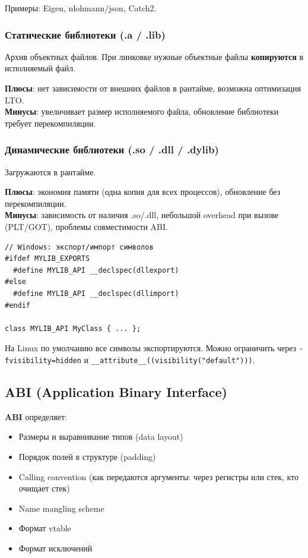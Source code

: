 \documentclass[12pt,a4paper]{article}
\begin{document}
Примеры: Eigen, nlohmann/json, Catch2.

\subsubsection{Статические библиотеки (.a / .lib)}
Архив объектных файлов. При линковке нужные объектные файлы \textbf{копируются} в исполняемый файл.

\textbf{Плюсы}: нет зависимости от внешних файлов в рантайме, возможна оптимизация LTO.\\
\textbf{Минусы}: увеличивает размер исполняемого файла, обновление библиотеки требует перекомпиляции.

\subsubsection{Динамические библиотеки (.so / .dll / .dylib)}
Загружаются в рантайме.

\textbf{Плюсы}: экономия памяти (одна копия для всех процессов), обновление без перекомпиляции.\\
\textbf{Минусы}: зависимость от наличия .so/.dll, небольшой overhead при вызове (PLT/GOT), проблемы совместимости ABI.

\begin{lstlisting}
// Windows: экспорт/импорт символов
#ifdef MYLIB_EXPORTS
  #define MYLIB_API __declspec(dllexport)
#else
  #define MYLIB_API __declspec(dllimport)
#endif

class MYLIB_API MyClass { ... };
\end{lstlisting}

На Linux по умолчанию все символы экспортируются. Можно ограничить через \texttt{-fvisibility=hidden} и \texttt{\_\_attribute\_\_((visibility("default")))}.

\subsection{ABI (Application Binary Interface)}

\textbf{ABI} определяет:
\begin{itemize}
    \item Размеры и выравнивание типов (data layout)
    \item Порядок полей в структуре (padding)
    \item Calling convention (как передаются аргументы: через регистры или стек, кто очищает стек)
    \item Name mangling scheme
    \item Формат vtable
    \item Формат исключений
\end{itemize}
\end{document}
